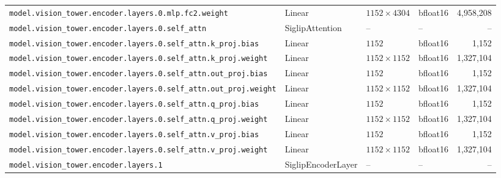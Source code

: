 \documentclass[10pt,a4paper]{article}
\theoremstyle{definition}
\begin{document}
\begin{appendices}
{\begin{longtable}{p{6.8cm}>{\raggedright\arraybackslash}p{3.3cm}llr}
\texttt{model.\allowbreak{}vision\_tower.\allowbreak{}encoder.\allowbreak{}layers.\allowbreak{}0.\allowbreak{}mlp.\allowbreak{}fc2.\allowbreak{}weight} & Linear & $1152 \times 4304$ & bfloat16 & 4,958,208 \\
\texttt{model.\allowbreak{}vision\_tower.\allowbreak{}encoder.\allowbreak{}layers.\allowbreak{}0.\allowbreak{}self\_attn} & Siglip\allowbreak{}Attention & -- & -- & -- \\
\texttt{model.\allowbreak{}vision\_tower.\allowbreak{}encoder.\allowbreak{}layers.\allowbreak{}0.\allowbreak{}self\_attn.\allowbreak{}k\_proj.\allowbreak{}bias} & Linear & $1152$ & bfloat16 & 1,152 \\
\texttt{model.\allowbreak{}vision\_tower.\allowbreak{}encoder.\allowbreak{}layers.\allowbreak{}0.\allowbreak{}self\_attn.\allowbreak{}k\_proj.\allowbreak{}weight} & Linear & $1152 \times 1152$ & bfloat16 & 1,327,104 \\
\texttt{model.\allowbreak{}vision\_tower.\allowbreak{}encoder.\allowbreak{}layers.\allowbreak{}0.\allowbreak{}self\_attn.\allowbreak{}out\_proj.\allowbreak{}bias} & Linear & $1152$ & bfloat16 & 1,152 \\
\texttt{model.\allowbreak{}vision\_tower.\allowbreak{}encoder.\allowbreak{}layers.\allowbreak{}0.\allowbreak{}self\_attn.\allowbreak{}out\_proj.\allowbreak{}weight} & Linear & $1152 \times 1152$ & bfloat16 & 1,327,104 \\
\texttt{model.\allowbreak{}vision\_tower.\allowbreak{}encoder.\allowbreak{}layers.\allowbreak{}0.\allowbreak{}self\_attn.\allowbreak{}q\_proj.\allowbreak{}bias} & Linear & $1152$ & bfloat16 & 1,152 \\
\texttt{model.\allowbreak{}vision\_tower.\allowbreak{}encoder.\allowbreak{}layers.\allowbreak{}0.\allowbreak{}self\_attn.\allowbreak{}q\_proj.\allowbreak{}weight} & Linear & $1152 \times 1152$ & bfloat16 & 1,327,104 \\
\texttt{model.\allowbreak{}vision\_tower.\allowbreak{}encoder.\allowbreak{}layers.\allowbreak{}0.\allowbreak{}self\_attn.\allowbreak{}v\_proj.\allowbreak{}bias} & Linear & $1152$ & bfloat16 & 1,152 \\
\texttt{model.\allowbreak{}vision\_tower.\allowbreak{}encoder.\allowbreak{}layers.\allowbreak{}0.\allowbreak{}self\_attn.\allowbreak{}v\_proj.\allowbreak{}weight} & Linear & $1152 \times 1152$ & bfloat16 & 1,327,104 \\
\texttt{model.\allowbreak{}vision\_tower.\allowbreak{}encoder.\allowbreak{}layers.\allowbreak{}1} & Siglip\allowbreak{}Encoder\allowbreak{}Layer & -- & -- & -- \\

\end{longtable}}
\end{appendices}
\end{document}
